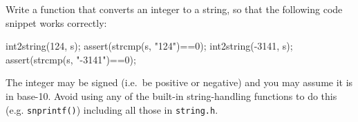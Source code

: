 
\begin{exercise}
Write a function that converts an integer
to a string, so that the following code snippet
works correctly:

\begin{codesnippet}
int2string(124, s);
assert(strcmp(s, "124")==0);
int2string(-3141, s);
assert(strcmp(s, "-3141")==0);
\end{codesnippet}

The integer may be signed (i.e.\ be positive or negative)
and you may assume it is in base-10.
Avoid using any of the built-in string-handling functions
to do this (e.g. \verb^snprintf()^)
including all those in \verb^string.h^.
\end{exercise}

